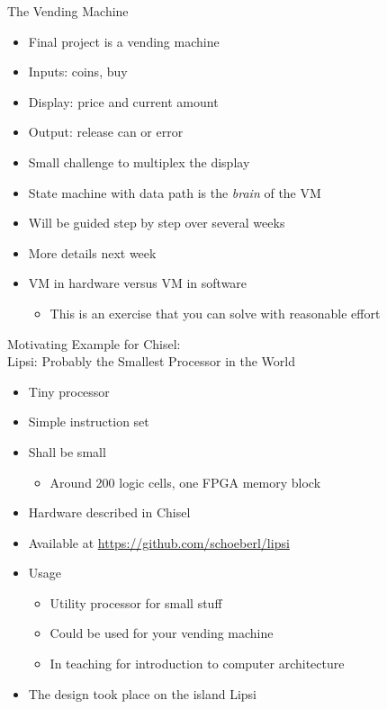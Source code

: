 \begin{frame}[fragile]{The Vending Machine}
\begin{itemize}
\item Final project is a vending machine
\item Inputs: coins, buy
\item Display: price and current amount
\item Output: release can or error
\item Small challenge to multiplex the display
\item State machine with data path is the \emph{brain} of the VM
\item Will be guided step by step over several weeks
\item More details next week
\item VM in hardware versus VM in software
\begin{itemize}
\item This is an exercise that you can solve with reasonable effort
\end{itemize}
\end{itemize}
\end{frame}


\begin{frame}[fragile]{Motivating Example for Chisel:\\
Lipsi: Probably the Smallest Processor in the World}
\begin{itemize}
\item Tiny processor
\item Simple instruction set
\item Shall be small
\begin{itemize}
\item Around 200 logic cells, one FPGA memory block
\end{itemize}
\item Hardware described in Chisel
\item Available at \url{https://github.com/schoeberl/lipsi}
\item Usage
\begin{itemize}
\item Utility processor for small stuff
\item Could be used for your vending machine
\item In teaching for introduction to computer architecture
\end{itemize}
\item The design took place on the island Lipsi
\end{itemize}
\end{frame}

